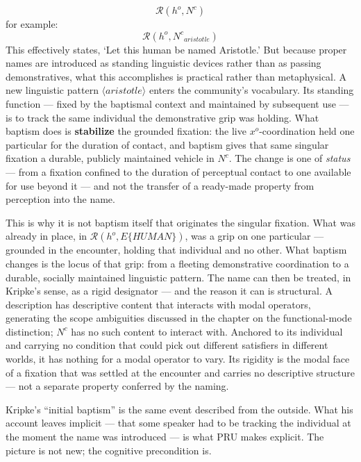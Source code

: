 \documentclass[12pt,a4paper]{article}
\begin{document}
\[\mathcal{R}(h^o, N^c)\] for example: \[\mathcal{R}(h^o, {N^c}_{aristotle})\] This effectively states, `Let this human be named Aristotle.' But because proper names are introduced as standing linguistic devices rather than as passing demonstratives, what this accomplishes is practical rather than metaphysical. A new linguistic pattern \(\langle aristotle \rangle\) enters the community's vocabulary. Its standing function --- fixed by the baptismal context and maintained by subsequent use --- is to track the same individual the demonstrative grip was holding. What baptism does is \textbf{stabilize} the grounded fixation: the live \(x^o\)-coordination held one particular for the duration of contact, and baptism gives that same singular fixation a durable, publicly maintained vehicle in \(N^c\). The change is one of \emph{status} --- from a fixation confined to the duration of perceptual contact to one available for use beyond it --- and not the transfer of a ready-made property from perception into the name.

This is why it is not baptism itself that originates the singular fixation. What was already in place, in \(\mathcal{R}(h^o, E\{HUMAN\})\), was a grip on one particular --- grounded in the encounter, holding that individual and no other. What baptism changes is the locus of that grip: from a fleeting demonstrative coordination to a durable, socially maintained linguistic pattern. The name can then be treated, in Kripke's sense, as a rigid designator --- and the reason it can is structural. A description has descriptive content that interacts with modal operators, generating the scope ambiguities discussed in the chapter on the functional-mode distinction; \(N^c\) has no such content to interact with. Anchored to its individual and carrying no condition that could pick out different satisfiers in different worlds, it has nothing for a modal operator to vary. Its rigidity is the modal face of a fixation that was settled at the encounter and carries no descriptive structure --- not a separate property conferred by the naming.

Kripke's ``initial baptism'' is the same event described from the outside. What his account leaves implicit --- that some speaker had to be tracking the individual at the moment the name was introduced --- is what PRU makes explicit. The picture is not new; the cognitive precondition is.
\end{document}

